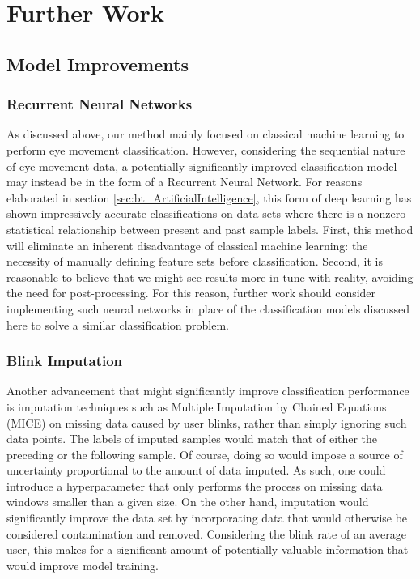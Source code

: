 \section{Further Work}

\subsection{Model Improvements}

\subsubsection{Recurrent Neural Networks}

As discussed above, our method mainly focused on classical machine learning to perform eye movement classification. However, considering the sequential nature of eye movement data, a potentially significantly improved classification model may instead be in the form of a Recurrent Neural Network. For reasons elaborated in section \ref{sec:bt_ArtificialIntelligence}, this form of deep learning has shown impressively accurate classifications on data sets where there is a nonzero statistical relationship between present and past sample labels. First, this method will eliminate an inherent disadvantage of classical machine learning: the necessity of manually defining feature sets before classification. Second, it is reasonable to believe that we might see results more in tune with reality, avoiding the need for post-processing. For this reason, further work should consider implementing such neural networks in place of the classification models discussed here to solve a similar classification problem.

\subsubsection{Blink Imputation}

Another advancement that might significantly improve classification performance is imputation techniques such as Multiple Imputation by Chained Equations (MICE) on missing data caused by user blinks, rather than simply ignoring such data points. The labels of imputed samples would match that of either the preceding or the following sample. Of course, doing so would impose a source of uncertainty proportional to the amount of data imputed. As such, one could introduce a hyperparameter that only performs the process on missing data windows smaller than a given size. On the other hand, imputation would significantly improve the data set by incorporating data that would otherwise be considered contamination and removed. Considering the blink rate of an average user, this makes for a significant amount of potentially valuable information that would improve model training. 

